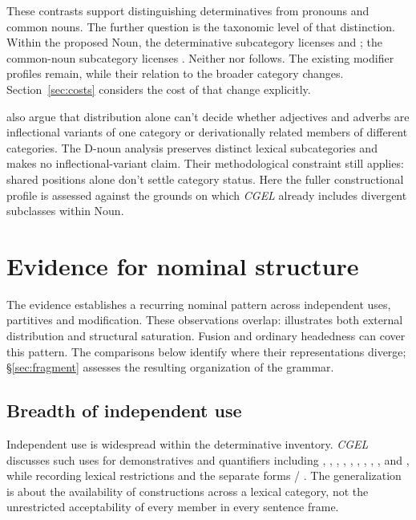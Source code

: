 \documentclass[12pt]{article}
\begin{document}
These contrasts support distinguishing determinatives from pronouns and common nouns. The further question is the taxonomic level of that distinction. Within the proposed Noun, the determinative subcategory licenses  and ; the common-noun subcategory licenses . Neither  nor  follows. The existing modifier profiles remain, while their relation to the broader category changes. Section~\ref{sec:costs} considers the cost of that change explicitly.

\textcite[60--61]{payne2010} also argue that distribution alone can't decide whether adjectives and adverbs are inflectional variants of one category or derivationally related members of different categories. The D-noun analysis preserves distinct lexical subcategories and makes no inflectional-variant claim. Their methodological constraint still applies: shared positions alone don't settle category status. Here the fuller constructional profile is assessed against the grounds on which \textit{CGEL} already includes divergent subclasses within Noun.

\section{Evidence for nominal structure}\label{sec:evidence}

The evidence establishes a recurring nominal pattern across independent uses, partitives and modification. These observations overlap:  illustrates both external distribution and structural saturation. Fusion and ordinary headedness can cover this pattern. The comparisons below identify where their representations diverge; §\ref{sec:fragment} assesses the resulting organization of the grammar.

\subsection{Breadth of independent use}

Independent use is widespread within the determinative inventory. \textit{CGEL} discusses such uses for demonstratives and quantifiers including , , , , , , , , ,  and , while recording lexical restrictions and the separate forms / \citep[371--372, 410--424]{huddleston2002}. The generalization is about the availability of constructions across a lexical category, not the unrestricted acceptability of every member in every sentence frame.
\end{document}
